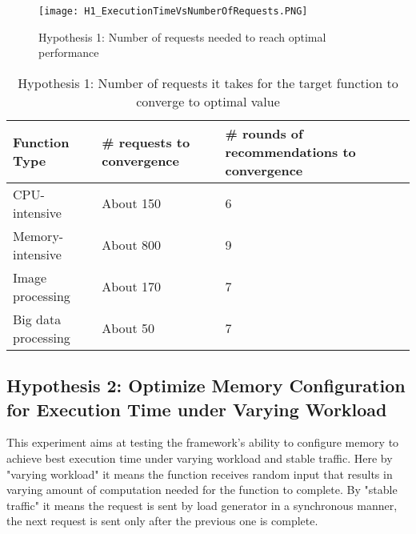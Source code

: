 \documentclass[conference]{IEEEtran}
\begin{document}
\begin{figure}
    \texttt{[image: H1\_ExecutionTimeVsNumberOfRequests.PNG]}
    \caption{Hypothesis 1: Number of requests needed to reach optimal performance}
    \label{fig: h1_results}
\end{figure}

\begin{table}
\centering

\begin{tabular}{|p{1in}|p{1in}|p{1in}|}
\hline
Function Type & \# requests to convergence& \# rounds of recommendations to convergence\\
\hline

\hline
CPU-intensive & About 150 & 6\\
\hline
Memory-intensive & About 800 & 9\\
\hline
Image processing & About 170 & 7 \\
\hline
Big data processing & About 50 & 7\\
\hline

\end{tabular}
\caption{Hypothesis 1: Number of requests it takes for the target function to converge to optimal value}
\label{table: 2}
\end{table}


\subsection{Hypothesis 2: Optimize Memory Configuration for Execution Time under Varying Workload}

This experiment aims at testing the framework's ability to configure memory to achieve best execution time under varying workload and stable traffic. Here by "varying workload" it means the function receives random input that results in varying amount of computation needed for the function to complete. By "stable traffic" it means the request is sent by load generator in a synchronous manner, the next request is sent only after the previous one is complete.
\end{document}
